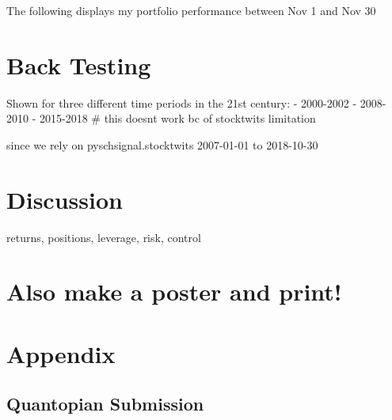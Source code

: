 \documentclass[11pt,]{article}
\begin{document}
The following displays my portfolio performance between Nov 1 and Nov 30

\section{Back Testing}\label{back-testing}

Shown for three different time periods in the 21st century: - 2000-2002
- 2008-2010 - 2015-2018 \# this doesnt work bc of stocktwits limitation

since we rely on pyschsignal.stocktwits 2007-01-01 to 2018-10-30

\section{Discussion}\label{discussion}

returns, positions, leverage, risk, control

\section{Also make a poster and
print!}\label{also-make-a-poster-and-print}

\section{Appendix}\label{appendix}

\subsection{Quantopian Submission}\label{quantopian-submission}
\end{document}
